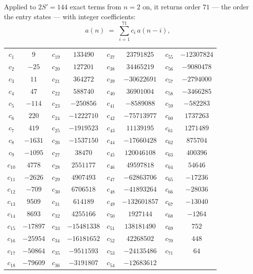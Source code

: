 \documentclass[11pt,a4paper]{article}
\theoremstyle{plain}
\theoremstyle{definition}
\begin{document}
Applied to $2S'=144$ exact terms from $n=2$ on, it returns order $71$ --- the
order the entry states --- with integer coefficients:
\[
a(n)\;=\;\sum_{i=1}^{71}c_i\,a(n-i),
\]
\begin{center}\small
\begin{tabular}{cccccccc}
$c_{1}$ & $9$ & $c_{19}$ & $133490$ & $c_{37}$ & $23791825$ & $c_{55}$ & $-12307824$ \\
$c_{2}$ & $-25$ & $c_{20}$ & $127201$ & $c_{38}$ & $34465219$ & $c_{56}$ & $-9080478$ \\
$c_{3}$ & $11$ & $c_{21}$ & $364272$ & $c_{39}$ & $-30622691$ & $c_{57}$ & $-2794000$ \\
$c_{4}$ & $47$ & $c_{22}$ & $588740$ & $c_{40}$ & $36901004$ & $c_{58}$ & $-3466285$ \\
$c_{5}$ & $-114$ & $c_{23}$ & $-250856$ & $c_{41}$ & $-8589088$ & $c_{59}$ & $-582283$ \\
$c_{6}$ & $220$ & $c_{24}$ & $-1222710$ & $c_{42}$ & $-75713977$ & $c_{60}$ & $1737263$ \\
$c_{7}$ & $419$ & $c_{25}$ & $-1919523$ & $c_{43}$ & $11139195$ & $c_{61}$ & $1271489$ \\
$c_{8}$ & $-1631$ & $c_{26}$ & $-1537150$ & $c_{44}$ & $-17660428$ & $c_{62}$ & $875704$ \\
$c_{9}$ & $-1095$ & $c_{27}$ & $38470$ & $c_{45}$ & $120046108$ & $c_{63}$ & $400396$ \\
$c_{10}$ & $4778$ & $c_{28}$ & $2551177$ & $c_{46}$ & $49597818$ & $c_{64}$ & $54646$ \\
$c_{11}$ & $-2626$ & $c_{29}$ & $4907493$ & $c_{47}$ & $-62863706$ & $c_{65}$ & $-17236$ \\
$c_{12}$ & $-709$ & $c_{30}$ & $6706518$ & $c_{48}$ & $-41893264$ & $c_{66}$ & $-28036$ \\
$c_{13}$ & $9509$ & $c_{31}$ & $614189$ & $c_{49}$ & $-132601857$ & $c_{67}$ & $-13040$ \\
$c_{14}$ & $8693$ & $c_{32}$ & $4255166$ & $c_{50}$ & $1927144$ & $c_{68}$ & $-1264$ \\
$c_{15}$ & $-17897$ & $c_{33}$ & $-15481338$ & $c_{51}$ & $138181490$ & $c_{69}$ & $752$ \\
$c_{16}$ & $-25954$ & $c_{34}$ & $-16181652$ & $c_{52}$ & $42268502$ & $c_{70}$ & $448$ \\
$c_{17}$ & $-50864$ & $c_{35}$ & $-9511593$ & $c_{53}$ & $-24135486$ & $c_{71}$ & $64$ \\
$c_{18}$ & $-79609$ & $c_{36}$ & $-3191807$ & $c_{54}$ & $-12683612$ &  &  \\
\end{tabular}
\end{center}
\end{document}

